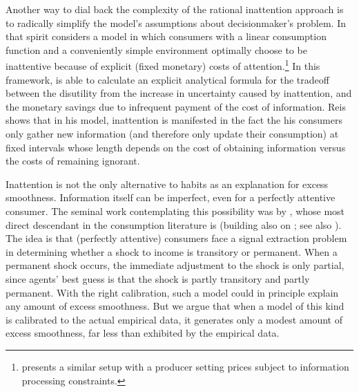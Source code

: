 \documentclass[titlepage]{\econtex}\newcommand{\texname}{cAndCwithStickyE}
\begin{document}
Another way to dial back the complexity of the rational inattention approach is to radically simplify the model's assumptions about decisionmaker's problem.  In that spirit \cite{reis:inattentive} considers a model in which consumers with a linear consumption function and a conveniently simple environment optimally choose to be inattentive because of explicit (fixed monetary) costs of attention.\footnote{\cite{reis:inpro} presents a similar setup with a producer setting prices subject to information processing constraints.}  In this framework, \cite{reis:inattentive} is able to calculate an explicit analytical formula for the tradeoff between the disutility from the increase in uncertainty caused by inattention, and the monetary savings due to infrequent payment of the cost of information.  Reis shows that in his model, inattention is manifested in the fact the his consumers only gather new information (and therefore only update their consumption) at fixed intervals whose length depends on the cost of obtaining information versus the costs of remaining ignorant.

Inattention is not the only alternative to habits as an explanation for excess smoothness.  Information itself can be imperfect, even for a perfectly attentive consumer.  The seminal work contemplating this possibility was by \cite{muthOptimal}, whose most direct descendant in the consumption literature is \cite{pischkeMicroMacro} (building also on \cite{lucas:imperfectInfo}; see also \cite{ludvigson&michaelides:excesses}).  The idea is that (perfectly attentive) consumers face a signal extraction problem in determining whether a shock to income is transitory or permanent.  When a permanent shock occurs, the immediate adjustment to the shock is only partial, since agents' best guess is that the shock is partly transitory and partly permanent.   With the right calibration, such a model could in principle explain any amount of excess smoothness.  But we argue that when a model of this kind is calibrated to the actual empirical data, it generates only a modest amount of excess smoothness, far less than exhibited by the empirical data.
\end{document}
